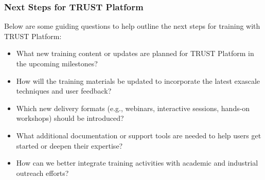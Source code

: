 \subsubsection{Next Steps for TRUST Platform}
\label{sec:TRUST Platform:next-steps}

Below are some guiding questions to help outline the next steps for training with TRUST Platform:
\begin{itemize}
    \item What new training content or updates are planned for TRUST Platform in the upcoming milestones?
    \item How will the training materials be updated to incorporate the latest exascale techniques and user feedback?
    \item Which new delivery formats (e.g., webinars, interactive sessions, hands-on workshops) should be introduced?
    \item What additional documentation or support tools are needed to help users get started or deepen their expertise?
    \item How can we better integrate training activities with academic and industrial outreach efforts?
\end{itemize}